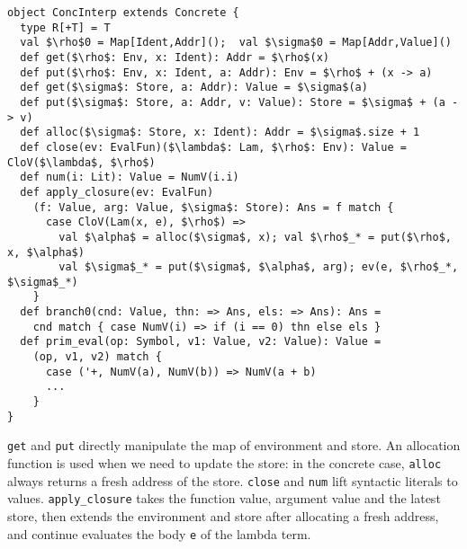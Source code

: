 \begin{lstlisting}
object ConcInterp extends Concrete {
  type R[+T] = T
  val $\rho$0 = Map[Ident,Addr]();  val $\sigma$0 = Map[Addr,Value]()
  def get($\rho$: Env, x: Ident): Addr = $\rho$(x)
  def put($\rho$: Env, x: Ident, a: Addr): Env = $\rho$ + (x -> a)
  def get($\sigma$: Store, a: Addr): Value = $\sigma$(a)
  def put($\sigma$: Store, a: Addr, v: Value): Store = $\sigma$ + (a -> v)
  def alloc($\sigma$: Store, x: Ident): Addr = $\sigma$.size + 1
  def close(ev: EvalFun)($\lambda$: Lam, $\rho$: Env): Value = CloV($\lambda$, $\rho$)
  def num(i: Lit): Value = NumV(i.i)
  def apply_closure(ev: EvalFun)
    (f: Value, arg: Value, $\sigma$: Store): Ans = f match {
      case CloV(Lam(x, e), $\rho$) =>
        val $\alpha$ = alloc($\sigma$, x); val $\rho$_* = put($\rho$, x, $\alpha$)
        val $\sigma$_* = put($\sigma$, $\alpha$, arg); ev(e, $\rho$_*, $\sigma$_*)
    }
  def branch0(cnd: Value, thn: => Ans, els: => Ans): Ans = 
    cnd match { case NumV(i) => if (i == 0) thn else els }
  def prim_eval(op: Symbol, v1: Value, v2: Value): Value = 
    (op, v1, v2) match {
      case ('+, NumV(a), NumV(b)) => NumV(a + b)
      ...
    }
}
\end{lstlisting}

\texttt{get} and \texttt{put} directly manipulate the map of environment and store. 
An allocation function is used when we need to update the store: 
in the concrete case, \texttt{alloc} always returns a fresh address of the store.
\texttt{close} and \texttt{num} lift syntactic literals to values.
\texttt{apply\_closure} takes the function value, argument value and the latest store,
then extends the environment and store after allocating a fresh address, and continue
evaluates the body \texttt{e} of the lambda term.
